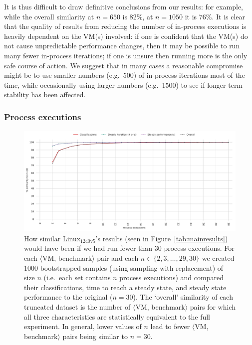 \documentclass[acmsmall,screen]{acmart}
\newcommand{\bencherseven}{Linux$_\mathrm{1240v5}$\xspace}
\newcommand{\vmbpair}{$\langle$VM, benchmark$\rangle$\xspace}
\newcommand{\numpexecs}{30\xspace}
\begin{document}
It is thus difficult to draw definitive conclusions from our results:
for example, while the overall similarity at $n=650$ is 82\%, at $n=1050$ it is 76\%.
It is clear that the quality of results from reducing the number
of in-process executions
is heavily dependent on the VM(s) involved: if one is confident that the VM(s) do not cause
unpredictable performance changes, then it may be possible to run many fewer
in-process iterations; if one is unsure then running more is the only safe
course of action. We suggest that in many cases a reasonable compromise might be to
use smaller numbers (e.g.~500) of in-process iterations most
of the time, while occasionally using larger numbers (e.g.~1500) to see if
longer-term stability has been affected.


\subsubsection{Process executions}

\begin{figure}[tbp]
\centering
\includegraphics[width=\textwidth]{examples/truncated_pexecs_plot.pdf}
\caption{How similar \bencherseven's results (seen in Figure~\ref{tab:mainresults})
would have been if we had run fewer than
\numpexecs process executions. For each \vmbpair pair and each
$n \in \{2, 3, \ldots, 29, 30\}$ we created 1000 bootstrapped samples (using sampling with replacement)
of size $n$ (i.e.~each set contains $n$ process executions)
and compared their classifications, time to reach a steady state, and
steady state performance to the original ($n=30$). The `overall' similarity of
each truncated dataset is the number of \vmbpair pairs for which all three
characteristics are statistically equivalent to the full experiment. In general,
lower values of $n$ lead to fewer \vmbpair pairs being similar to
$n=30$.} \label{fig:pexecstruncated}
\end{figure}
\end{document}
